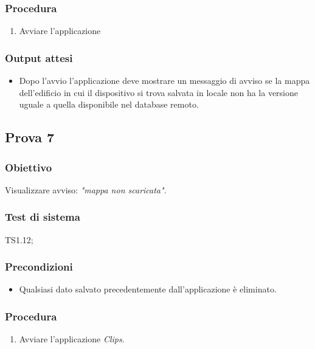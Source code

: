 \documentclass[../Sperimentazione.tex]{subfiles}
\begin{document}
	\subsubsection{Procedura}	
	
		\begin{enumerate}
		\item Avviare l'applicazione
		\end{enumerate}
		
	\subsubsection{Output attesi}
		\begin{itemize}
		\item Dopo l'avvio l'applicazione deve mostrare un messaggio di avviso se la mappa dell'edificio in cui il dispositivo si trova salvata in locale non ha la versione uguale a quella disponibile nel database remoto.
		\end{itemize}
	
	
	
\newpage	
\subsection{Prova 7} %
\label{subsec:Prova7}	
	
	\subsubsection{Obiettivo}
		Visualizzare avviso: \textit{"mappa non scaricata"}.
		
	\subsubsection{Test di sistema}
		TS1.12;
		
	\subsubsection{Precondizioni}
		\begin{itemize}
			\item Qualsiasi dato salvato precedentemente dall'applicazione è eliminato.
		\end{itemize}
		
	\subsubsection{Procedura}
		\begin{enumerate}
		\item Avviare l'applicazione \textit{Clips}.
		\end{enumerate}
		
\end{document}
